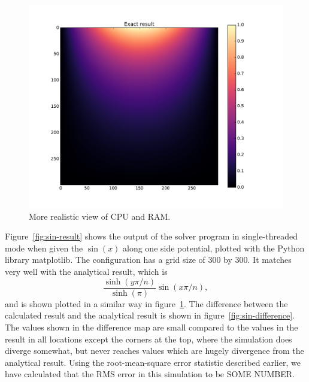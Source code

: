 	\begin{figure}[h]
	\centering
	\includegraphics[width=1.1\linewidth]{sin300_exact.pdf}
	\caption{More realistic view of CPU and RAM.}
	\label{fig:sin-analytic}
	\end{figure}

Figure~\ref{fig:sin-result} shows the output of the solver program in single-threaded mode when given the $\sin(x)$ along one side
potential, plotted with the Python library matplotlib. The configuration has a grid size of 300 by 300. It matches very well with the analytical result, which
is
$$\frac{\sinh(y \pi / n)}{\sinh(\pi)} \sin(x \pi / n),$$
and is shown plotted in a similar way in figure~\ref{fig:sin-analytic}. The difference between the calculated result and the
analytical result is shown in figure~\ref{fig:sin-difference}. The values shown in the difference map are small compared
to the values in the result in all locations except the corners at the top, where the simulation does diverge somewhat, 
but never reaches values which are hugely divergence from the analytical result. Using the root-mean-square error statistic
described earlier, we have calculated that the RMS error in this simulation to be SOME NUMBER.


